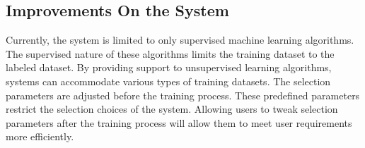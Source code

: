 \subsection{Improvements On the System}\label{subsec:improvements_on_system}

Currently, the system is limited to only supervised machine learning algorithms. The supervised nature of these algorithms limits the training dataset to the labeled dataset. By providing support to unsupervised learning algorithms, systems can accommodate various types of training datasets. The selection parameters are adjusted before the training process. These predefined parameters restrict the selection choices of the system. Allowing users to tweak selection parameters after the training process will allow them to meet user requirements more efficiently.
